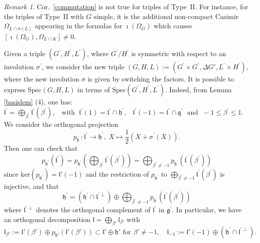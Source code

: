 \documentclass[10]{amsart}
\theoremstyle{remark}
\newtheorem{rem}[thm]{Remark}
\theoremstyle{definition}
\numberwithin{equation}{section}
\newcommand{\fh}{{\mathfrak h}}
\newcommand{\fl}{{\mathfrak l}}
\begin{document}
{\begin{rem}\label{noncomm}
Cor.~\ref{commutation} is not true for triples of Type~II. 
For instance, for the triples of Type~II with $G$ simple, it is the additional non-compact Casimir
$\Omega_{L\cap\sigma(L)}$ appearing in the formulas for $\imath(\Omega_G)$ which causes $[\imath(\Omega_G),\Omega_{L\cap K}]\ne 0$.
\end{rem}
%

Given a triple $(G^\prime,H^\prime,L^\prime)$, where $G^\prime/H^\prime$ is symmetric with respect to an involution $\sigma^\prime$, we consider the new triple 
$(G,H,L):=(G^\prime\times G^\prime,\Delta G', L^\prime\times H^\prime)$, where the new involution $\sigma$ is given by switching the factors. It is possible to express $\text{Spec}(G,H,L)$ in terms of $\text{Spec}(G^\prime,H^\prime,L^\prime)$. Indeed, from Lemma \ref{basislem} (4), one has: ${\mathfrak l}^\prime=\bigoplus_{\beta^\prime}{\mathfrak l}^\prime(\beta^\prime),\;\;\text{ with }\;{\mathfrak l}^\prime(1)={\mathfrak l}^\prime\cap{\mathfrak h}^\prime,\;\;\;{\mathfrak l}^\prime(-1)={\mathfrak l}^\prime\cap{\mathfrak q}^\prime\;\text{ and }\;-1\leq\beta^\prime\leq 1$. We consider the orthogonal projection 
$$p_{\fh^\prime}:{\mathfrak l}^\prime\rightarrow{\mathfrak h}^\prime,\;X\mapsto\frac{1}{2}(X+\sigma^\prime(X)).$$ 
Then one can check that
%
\begin{equation*}
p_{\fh^\prime}({\mathfrak l}^\prime)=p_{\fh^\prime}(\bigoplus_{\beta^\prime}{\mathfrak l}^\prime(\beta^\prime))=\bigoplus_{\beta^\prime\neq -1}p_{\fh^\prime}({\mathfrak l}^\prime(\beta^\prime))
\end{equation*}
%
since $\text{ker}(p_{\fh^\prime})=\fl'(-1)$ and the restriction of $p_{\fh^\prime}$ to $\bigoplus_{\beta^\prime\neq -1}{\mathfrak l}^\prime(\beta^\prime)$ is injective, and that
%
\begin{equation*}
{\mathfrak h}^\prime=({\mathfrak h}^\prime\cap{\mathfrak l}^{\prime\perp})\oplus\bigoplus_{\beta^\prime\neq -1}p_{\fh^\prime}({\mathfrak l}^\prime(\beta^\prime))
\end{equation*}
%
where ${\mathfrak l}^{\prime\perp}$ denotes the orthogonal complement of ${\mathfrak l}^\prime$ in ${\mathfrak g}^\prime$. In particular, we have an orthogonal decomposition
$\fl=\bigoplus_{\beta'}\fl_{\beta'}$ with
$$ \fl_{\beta'}:= \fl'(\beta')\oplus p_{\fh'}( \fl'(\beta'))\subset \fl'\oplus \fh'\mbox{ for }\beta'\ne -1,\quad \fl_{-1}:=\fl'(-1)\oplus ({\mathfrak h}^\prime\cap{\mathfrak l}^{\prime\perp}).$$
}
\end{document}
